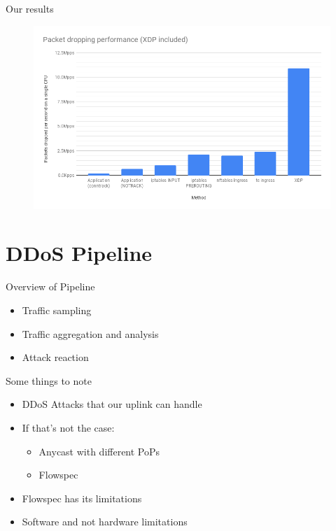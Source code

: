 \documentclass{beamer}
\begin{document}
\begin{frame}{Our results}

  \begin{figure}
    \includegraphics[width=1.1\textwidth]{./custom_xdp.png}
  \end{figure}
\end{frame}

\section{DDoS Pipeline}
\begin{frame}{Overview of Pipeline}
  \begin{itemize}
    \item Traffic sampling
    \item Traffic aggregation and analysis
    \item Attack reaction
  \end{itemize}
\end{frame}

\begin{frame}{Some things to note}
  \begin{itemize}
    \item DDoS Attacks that our uplink can handle
    \item If that's not the case:
      \begin{itemize}
        \item Anycast with different PoPs
        \item Flowspec
      \end{itemize}
    \item Flowspec has its limitations
    \item Software and not hardware limitations
  \end{itemize}
\end{frame}
\end{document}
